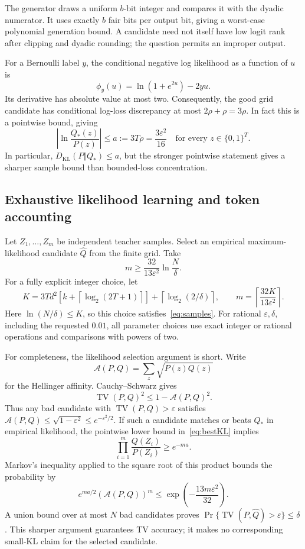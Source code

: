\documentclass[11pt]{article}
\newcommand{\TV}{\operatorname{TV}}
\newcommand{\KL}{D_{\mathrm{KL}}}
\theoremstyle{definition}
\theoremstyle{remark}
\begin{document}
The generator draws a uniform $b$-bit integer and compares it with the dyadic numerator. It uses exactly $b$ fair bits per output bit, giving a worst-case polynomial generation bound. A candidate need not itself have low logit rank after clipping and dyadic rounding; the question permits an improper output.

For a Bernoulli label $y$, the conditional negative log likelihood as a function of $u$ is
\[
\phi_y(u)=\ln(1+e^{2u})-2yu.
\]
Its derivative has absolute value at most two. Consequently, the good grid candidate has conditional log-loss discrepancy at most $2\rho+\rho=3\rho$. In fact this is a pointwise bound, giving
\begin{equation}\label{eq:bestKL}
\left|\ln\frac{Q_*(z)}{P(z)}\right|\le a:=3T\rho=\frac{3\varepsilon^2}{16}
\quad\text{for every }z\in\{0,1\}^T.
\end{equation}
In particular, $\KL(P\Vert Q_*)\le a$, but the stronger pointwise statement gives a sharper sample bound than bounded-loss concentration.

\subsection{Exhaustive likelihood learning and token accounting}

Let $Z_1,\ldots,Z_m$ be independent teacher samples. Select an empirical maximum-likelihood candidate $\widehat Q$ from the finite grid. Take
\begin{equation}\label{eq:samples}
m\ge\frac{32}{13\varepsilon^2}\ln\frac{N}{\delta}.
\end{equation}
For a fully explicit integer choice, let
\[
K=3Td^2\!\left[k+\left\lceil\log_2(2T+1)\right\rceil\right]
+\left\lceil\log_2(2/\delta)\right\rceil,
\qquad
m=\left\lceil\frac{32K}{13\varepsilon^2}\right\rceil.
\]
Here $\ln(N/\delta)\le K$, so this choice satisfies~\eqref{eq:samples}. For rational $\varepsilon,\delta$, including the requested $0.01$, all parameter choices use exact integer or rational operations and comparisons with powers of two.

For completeness, the likelihood selection argument is short. Write
\[
\mathcal A(P,Q)=\sum_z\sqrt{P(z)Q(z)}
\]
for the Hellinger affinity. Cauchy--Schwarz gives
\[
\TV(P,Q)^2\le1-\mathcal A(P,Q)^2.
\]
Thus any bad candidate with $\TV(P,Q)>\varepsilon$ satisfies
$\mathcal A(P,Q)\le\sqrt{1-\varepsilon^2}\le e^{-\varepsilon^2/2}$.
If such a candidate matches or beats $Q_*$ in empirical likelihood, the pointwise lower bound in~\eqref{eq:bestKL} implies
\[
\prod_{i=1}^m\frac{Q(Z_i)}{P(Z_i)}\ge e^{-ma}.
\]
Markov's inequality applied to the square root of this product bounds the probability by
\[
e^{ma/2}\left(\mathcal A(P,Q)\right)^m
\le\exp\left(-\frac{13m\varepsilon^2}{32}\right).
\]
A union bound over at most $N$ bad candidates proves
$\Pr\{\TV(P,\widehat Q)>\varepsilon\}\le\delta$.
This sharper argument guarantees TV accuracy; it makes no corresponding small-KL claim for the selected candidate.
\end{document}
